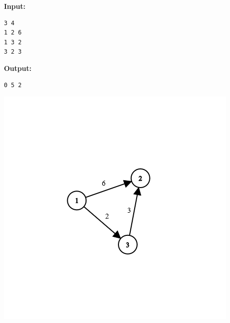 \documentclass{article}
\begin{document}
\begin{minipage}{0.5\textwidth}
\textbf{Input:}
\begin{verbatim}
3 4
1 2 6
1 3 2
3 2 3
\end{verbatim}

\textbf{Output:}
\begin{verbatim}
0 5 2
\end{verbatim}
\end{minipage}%
\hfill
\begin{minipage}{0.45\textwidth}
\centering
\includegraphics[width=\linewidth]{graph.png}
\end{minipage}
\end{document}
